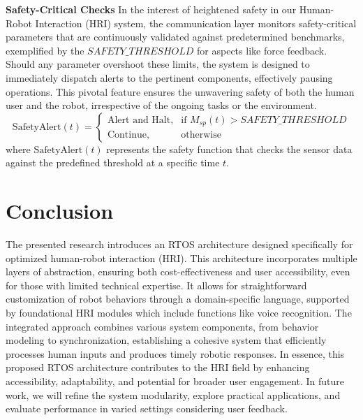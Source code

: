 \documentclass[runningheads]{llncs}
\begin{document}
\vspace{0.5cm}
\noindent\textbf{Safety-Critical Checks}
In the interest of heightened safety in our Human-Robot Interaction (HRI) system, the communication layer monitors safety-critical parameters that are continuously validated against predetermined benchmarks, exemplified by the \( SAFETY\_THRESHOLD \) for aspects like force feedback. Should any parameter overshoot these limits, the system is designed to immediately dispatch alerts to the pertinent components, effectively pausing operations. This pivotal feature ensures the unwavering safety of both the human user and the robot, irrespective of the ongoing tasks or the environment.
\begin{equation}
\text{SafetyAlert}(t) = \begin{cases} 
    \text{Alert and Halt,} & \text{if } M_{sp}(t) > SAFETY\_THRESHOLD \\
    \text{Continue,} & \text{otherwise}
\end{cases}
\end{equation}
where \( \text{SafetyAlert}(t) \) represents the safety function that checks the sensor data against the predefined threshold at a specific time \(t\).

\section{Conclusion}

The presented research introduces an RTOS architecture designed specifically for optimized human-robot interaction (HRI). This architecture incorporates multiple layers of abstraction, ensuring both cost-effectiveness and user accessibility, even for those with limited technical expertise. It allows for straightforward customization of robot behaviors through a domain-specific language, supported by foundational HRI modules which include functions like voice recognition. The integrated approach combines various system components, from behavior modeling to synchronization, establishing a cohesive system that efficiently processes human inputs and produces timely robotic responses. In essence, this proposed RTOS architecture contributes to the HRI field by enhancing accessibility, adaptability, and potential for broader user engagement. In future work, we will refine the system modularity, explore practical applications, and evaluate performance in varied settings considering user feedback.
\end{document}
